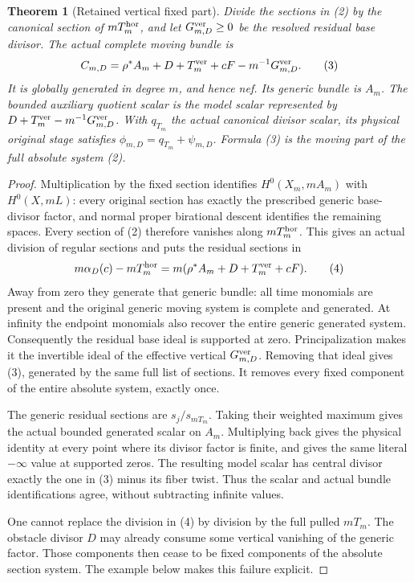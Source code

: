 \documentclass[10pt]{article}
\newtheorem{theorem}{Theorem}[section]
\begin{document}
\begin{theorem}[Retained vertical fixed part]\label{verticalformula}
Divide the sections in (2) by the canonical section of
$mT_m^{\rm hor}$, and let $G_{m,D}^{\rm ver}\geq0$ be the
resolved residual base divisor. The actual complete moving bundle is
\[
 C_{m,D}=\rho^*A_m+D+T_m^{\rm ver}+cF
                       -m^{-1}G_{m,D}^{\rm ver}.          \tag{3}
\]
It is globally generated in degree $m$, and hence nef. Its generic
bundle is $A_m$. The bounded auxiliary quotient scalar is the model
scalar represented by $D+T_m^{\rm ver}-m^{-1}G_{m,D}^{\rm ver}$.
With $q_{T_m}$ the actual canonical divisor scalar, its physical
original stage satisfies $\phi_{m,D}=q_{T_m}+\psi_{m,D}$.
Formula (3) is the moving part of the \emph{full} absolute system (2).
\end{theorem}
\begin{proof}
Multiplication by the fixed section identifies
$H^0(X_m,mA_m)$ with $H^0(X,mL)$: every original section has exactly
the prescribed generic base-divisor factor, and normal proper
birational descent identifies the remaining spaces. Every section of
(2) therefore vanishes along $mT_m^{\rm hor}$. This gives an actual
division of regular sections and puts the residual sections in
\[
 m\alpha_D(c)-mT_m^{\rm hor}
   =m(\rho^*A_m+D+T_m^{\rm ver}+cF).                      \tag{4}
\]
Away from zero they generate that generic bundle: all time monomials
are present and the original generic moving system is complete and
generated. At infinity the endpoint monomials also recover the entire
generic generated system. Consequently the residual base ideal is
supported at zero. Principalization makes it the invertible ideal of
the effective vertical $G_{m,D}^{\rm ver}$. Removing that ideal gives
(3), generated by the same full list of sections. It removes every
fixed component of the entire absolute system, exactly once.

The generic residual sections are $s_j/s_{mT_m}$. Taking their
weighted maximum gives the actual bounded generated scalar on $A_m$.
Multiplying back gives the physical identity at every point where its
divisor factor is finite, and gives the same literal $-\infty$ value
at supported zeros. The resulting model scalar has central divisor
exactly the one in (3) minus its fiber twist. Thus the scalar and actual
bundle identifications agree, without subtracting infinite values.

One cannot replace the division in (4) by division by the full pulled
$mT_m$. The obstacle divisor $D$ may already consume some vertical
vanishing of the generic factor. Those components then cease to be
fixed components of the absolute section system. The example below
makes this failure explicit.
\end{proof}
\end{document}
